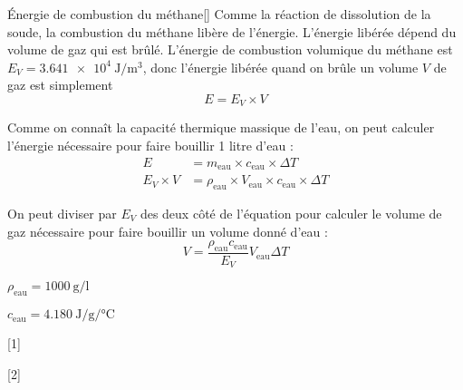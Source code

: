 \begin{doc}{Énergie de combustion du méthane}[\label{doc:energie_combustion}]
  Comme la réaction de dissolution de la soude, la combustion du méthane libère de l'énergie.
  L'énergie libérée dépend du volume de gaz qui est brûlé.
  L'énergie de combustion volumique du méthane est $E_V = \qty{3,641e4}{\joule\per\m\cubed}$, donc l'énergie libérée quand on brûle un volume $V$ de gaz est simplement 
  \begin{equation*}
    E = E_V \times V
  \end{equation*}

  Comme on connaît la capacité thermique massique de l'eau, on peut calculer l'énergie nécessaire pour faire bouillir 1 litre d'eau :
  \begin{align*}
    E &= m_\text{eau} \times c_\text{eau} \times \Delta T \\
    E_V \times V &= \rho_\text{eau} \times V_\text{eau} \times c_\text{eau} \times \Delta T
  \end{align*}

  On peut diviser par $E_V$ des deux côté de l'équation pour calculer le volume de gaz nécessaire pour faire bouillir un volume donné d'eau :
  \begin{equation*}
    V = \dfrac{\rho_\text{eau} c_\text{eau}}{E_V} V_\text{eau} \Delta T
  \end{equation*}

  \begin{donnees}
    \item $\rho_\text{eau} = \qty{1000}{\g\per\litre}$
    \item $c_\text{eau} = \qty{4,180}{\joule\per\g\per\degreeCelsius}$
  \end{donnees}
\end{doc}

[1]

[2]

